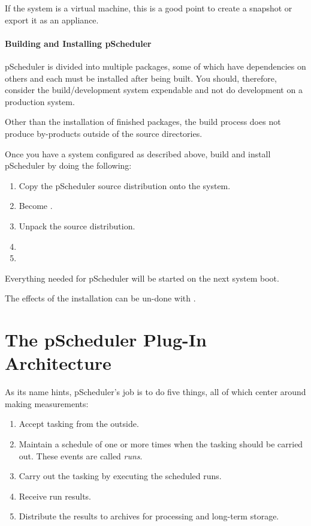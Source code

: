 \documentclass[10pt,titlepage]{article}
\begin{document}
If the system is a virtual machine, this is a good point to create a
snapshot or export it as an appliance.


\subsection{Building and Installing pScheduler}

pScheduler is divided into multiple packages, some of which have
dependencies on others and each must be installed after being built.
You should, therefore, consider the build/development system
expendable and not do development on a production system.

Other than the installation of finished packages, the build process
does not produce by-products outside of the source directories.

Once you have a system configured as described above, build and
install pScheduler by doing the following:

\begin{enumerate}
\item Copy the pScheduler source distribution onto the system.
\item Become \root.
\item Unpack the source distribution.
\item {}
\item {}
\end{enumerate}

Everything needed for pScheduler will be started on the next system
boot.

The effects of the installation can be un-done with .




\part{The pScheduler Plug-In Architecture}

As its name hints, pScheduler's job is to do five things, all of which
center around making measurements:

\begin{enumerate}
\item Accept tasking from the outside.
\item Maintain a schedule of one or more times when the tasking should
  be carried out.  These events are called {\it runs}.
\item Carry out the tasking by executing the scheduled runs.
\item Receive run results.
\item Distribute the results to archives for processing and long-term
  storage.
\end{enumerate}
\end{document}
